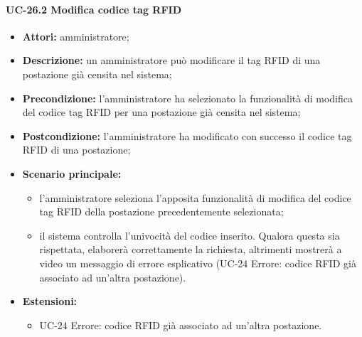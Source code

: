 \paragraph{UC-26.2 Modifica codice tag RFID}
\begin{itemize}
    \item \textbf{Attori:} amministratore;
    \item \textbf{Descrizione:} un amministratore pu\`{o} modificare il tag RFID di una postazione già censita nel sistema;
    \item \textbf{Precondizione:} l'amministratore ha selezionato la funzionalità di modifica del codice tag RFID per una postazione già censita nel sistema;
    \item \textbf{Postcondizione:} l'amministratore ha modificato con successo il codice tag RFID di una postazione;
    \item \textbf{Scenario principale:}
    \begin{itemize}
        \item l'amministratore seleziona l'apposita funzionalità di modifica del codice tag RFID della postazione precedentemente selezionata;
        \item il sistema controlla l'univocità del codice inserito. Qualora questa sia rispettata, elaborerà correttamente la richiesta, altrimenti mostrerà a video un messaggio di errore esplicativo (UC-24 Errore: codice RFID già associato ad un'altra postazione).
    \end{itemize}
    \item \textbf{Estensioni:}
		\begin{itemize}
		      \item UC-24 Errore: codice RFID già associato ad un'altra postazione.
	      \end{itemize}
\end{itemize}

 
